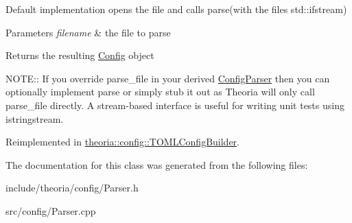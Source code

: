 Default implementation opens the file and calls parse(with the file\textquotesingle{}s std\+::ifstream)


\begin{DoxyParams}{Parameters}
{\em filename} & the file to parse \\
\hline
\end{DoxyParams}
\begin{DoxyReturn}{Returns}
the resulting \hyperlink{classtheoria_1_1config_1_1Config}{Config} object
\end{DoxyReturn}
N\+O\+TE\+:\+: If you override parse\+\_\+file in your derived \hyperlink{classtheoria_1_1config_1_1ConfigParser}{Config\+Parser} then you can optionally implement parse or simply stub it out as Theoria will only call parse\+\_\+file directly. A stream-\/based interface is useful for writing unit tests using istringstream. 

Reimplemented in \hyperlink{classtheoria_1_1config_1_1TOMLConfigBuilder_afba5445b56e12b39cf1b266627a27f58}{theoria\+::config\+::\+T\+O\+M\+L\+Config\+Builder}.



The documentation for this class was generated from the following files\+:\begin{DoxyCompactItemize}
\item 
include/theoria/config/Parser.\+h\item 
src/config/Parser.\+cpp\end{DoxyCompactItemize}
